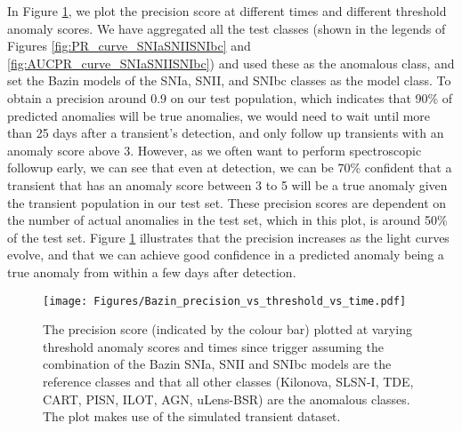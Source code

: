 \documentclass[fleqn,usenatbib]{mnras}
\begin{document}
In Figure \ref{fig:precision_vs_time_vs_threshold}, we plot the precision score at different times and different threshold anomaly scores. 
We have aggregated all the test classes (shown in the legends of Figures \ref{fig:PR_curve_SNIaSNIISNIbc} and \ref{fig:AUCPR_curve_SNIaSNIISNIbc}) and used these as the anomalous class, and set the Bazin models of the SNIa, SNII, and SNIbc classes as the model class. To obtain a precision around 0.9 on our test population, which indicates that 90\% of predicted anomalies will be true anomalies, we would need to wait until more than 25 days after a transient's detection, and only follow up transients with an anomaly score above 3. However, as we often want to perform spectroscopic followup early, we can see that even at detection, we can be 70\% confident that a transient that has an anomaly score between 3 to 5 will be a true anomaly given the transient population in our test set. These precision scores are dependent on the number of actual anomalies in the test set, which in this plot, is around 50\% of the test set. Figure \ref{fig:precision_vs_time_vs_threshold} illustrates that the precision increases as the light curves evolve, and that we can achieve good confidence in a predicted anomaly being a true anomaly from within a few days after detection.


\begin{figure}
    \centering
    \texttt{[image: Figures/Bazin\_precision\_vs\_threshold\_vs\_time.pdf]}
    \caption{The precision score (indicated by the colour bar) plotted at varying threshold anomaly scores and times since trigger assuming the combination of the Bazin SNIa, SNII and SNIbc models are the reference classes and that all other classes (Kilonova, SLSN-I, TDE, CART, PISN, ILOT, AGN, uLens-BSR) are the anomalous classes. The plot makes use of the simulated transient dataset.}
    \label{fig:precision_vs_time_vs_threshold}
\end{figure}
\end{document}
